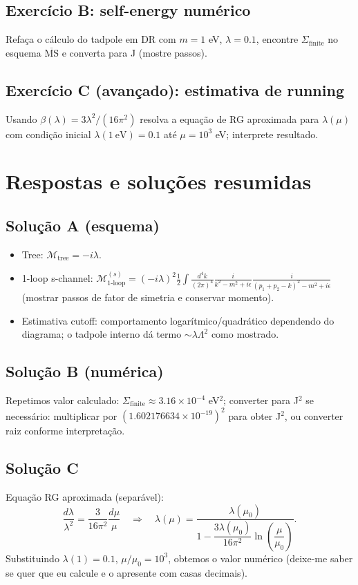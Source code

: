 \documentclass[12pt,a4paper]{article}
\begin{document}
\subsection{Exercício B: self-energy numérico}
Refaça o cálculo do tadpole em DR com \(m=1\) eV, \(\lambda=0.1\), encontre \(\Sigma_{\text{finite}}\) no esquema \(\overline{\text{MS}}\) e converta para J (mostre passos).

\subsection{Exercício C (avançado): estimativa de running}
Usando \(\beta(\lambda) = 3\lambda^2/(16\pi^2)\) resolva a equação de RG aproximada para \(\lambda(\mu)\) com condição inicial \(\lambda(1\ \mathrm{eV})=0.1\) até \(\mu=10^3\) eV; interprete resultado.

\section{Respostas e soluções resumidas}
\subsection{Solução A (esquema)}
\begin{itemize}
\item Tree: \(\mathcal{M}_{\text{tree}} = -i\lambda\).
\item 1-loop s-channel: \(\mathcal{M}_{1\text{-loop}}^{(s)} = (-i\lambda)^2 \frac{1}{2} \int \frac{d^4k}{(2\pi)^4} \frac{i}{k^2 - m^2 + i\epsilon} \frac{i}{(p_1+p_2-k)^2 - m^2 + i\epsilon}\) (mostrar passos de fator de simetria e conservar momento).
\item Estimativa cutoff: comportamento logarítmico/quadrático dependendo do diagrama; o tadpole interno dá termo \(\sim \lambda \Lambda^2\) como mostrado.
\end{itemize}

\subsection{Solução B (numérica)}
Repetimos valor calculado: \(\Sigma_{\text{finite}} \approx 3.16\times10^{-4}\) eV\(^2\); converter para J\(^2\) se necessário: multiplicar por \((1.602176634\times10^{-19})^2\) para obter J\(^2\), ou converter raiz conforme interpretação.

\subsection{Solução C}
Equação RG aproximada (separável):
\[
\frac{d\lambda}{\lambda^2} = \frac{3}{16\pi^2} \frac{d\mu}{\mu} \quad\Rightarrow\quad
\lambda(\mu) = \frac{\lambda(\mu_0)}{1 - \dfrac{3\lambda(\mu_0)}{16\pi^2} \ln\!\left(\dfrac{\mu}{\mu_0}\right)}.
\]
Substituindo \(\lambda(1) = 0.1\), \(\mu/\mu_0 = 10^3\), obtemos o valor numérico (deixe-me saber se quer que eu calcule e o apresente com casas decimais).
\end{document}
